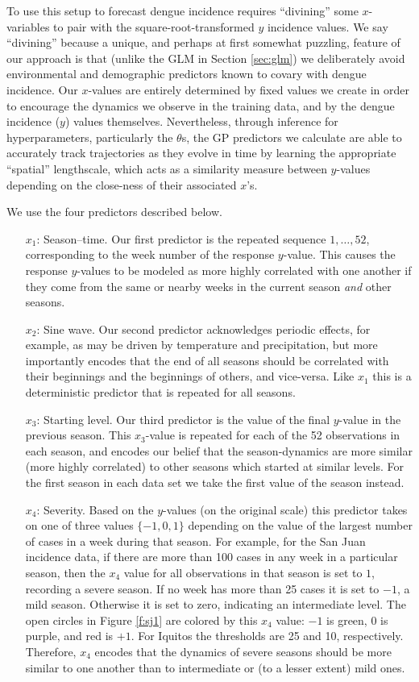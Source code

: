 \documentclass[12pt]{article}
\begin{document}
To use this setup to forecast dengue incidence requires ``divining'' some
$x$-variables to pair with the square-root-transformed $y$ incidence values.
We say ``divining'' because a unique, and perhaps at first somewhat puzzling,
feature of our approach is that (unlike the GLM in Section \ref{sec:glm}) we
deliberately avoid environmental and demographic predictors known to covary
with dengue incidence.  Our $x$-values are entirely determined by fixed values
we create in order to encourage the dynamics we observe in the training data,
and by the dengue incidence ($y$) values themselves.  Nevertheless, through
inference for hyperparameters, particularly the $\theta$s, the GP predictors
we calculate are able to accurately track trajectories as they evolve in time
by learning the appropriate ``spatial'' lengthscale, which acts as a
similarity measure between $y$-values depending on the close-ness of their
associated $x$'s.

We use the four predictors described below.
\begin{itemize}
\item[$x_1$:] Season--time.  Our first predictor is the repeated sequence $1, \dots, 52$,
corresponding to the week number of the response $y$-value.  This causes 
the  response $y$-values to be modeled as more highly
correlated with one another if they come from the same or nearby weeks in the
current season {\em and} other seasons.
\item[$x_2$: ] Sine wave.  Our second predictor acknowledges periodic effects,
for example, as may be driven by temperature and precipitation, but more
importantly encodes that the end of all seasons should be correlated with
their beginnings and the beginnings of others, and vice-versa.  Like $x_1$
this is a deterministic predictor that is repeated for all seasons.
\item[$x_3$: ] Starting level.  Our third predictor is the value of the final
$y$-value in the previous season.  This $x_3$-value is repeated for each of
the 52 observations in each season, and encodes our belief that the
season-dynamics are more similar (more highly correlated) to other seasons
which started at similar levels.  For the first season in each data set we
take the first value of the season instead.
\item[$x_4$: ] Severity.  Based on the $y$-values (on the original scale) 
this predictor takes on one of three values $\{-1, 0, 1\}$ depending on the
value of the largest number of cases in a week during that season.  For example, for the San
Juan incidence data, if there are more than 100 cases in any week in a particular season, then the $x_4$
value for all observations in that season is set to $1$, recording a severe
season.  If no week has more than 25 cases it is set to $-1$, a mild season.
Otherwise it is set to zero, indicating an intermediate level.  The open
circles in Figure \ref{f:sj1} are colored by this $x_4$ value: $-1$ is green,
$0$ is purple, and red is $+1$. For Iquitos the thresholds are 25 and 10,
respectively. Therefore, $x_4$ encodes that the dynamics of severe
seasons should be more similar to one another than to intermediate or (to a
lesser extent) mild ones.
\end{itemize} 
\end{document}
